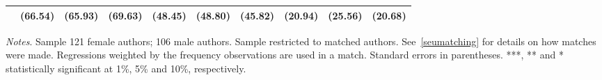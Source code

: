 \begin{landscape}
\begin{table}
\begin{threeparttable}
\begin{tabular}{p{2.5cm}SSSSSSSSS}
                                          &     (66.54)   &     (65.93)   &     (69.63)   &     (48.45)   &     (48.80)   &     (45.82)   &     (20.94)   &     (25.56)   &     (20.68)   \\
            \bottomrule
        \end{tabular}
        \begin{tablenotes}
            \tiny
            \item \textit{Notes}. Sample 121 female authors; 106 male authors. Sample restricted to matched authors. See~\autoref{seumatching} for details on how matches were made. Regressions weighted by the frequency observations are used in a match. Standard errors in parentheses. ***, ** and * statistically significant at 1\%, 5\% and 10\%, respectively.
        \end{tablenotes}
    \end{threeparttable}
\end{table}
\end{landscape}
